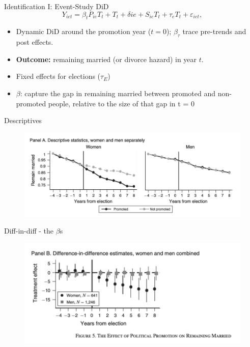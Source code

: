 \documentclass[11pt,notes=hide,aspectratio=169,mathserif]{beamer}
\begin{document}
\begin{frame}{Identification I: Event-Study DiD}
\small
\[
Y_{iet} = \beta_t P_{ie} T_t + T_t + \delta{ie} + S_{ie} T_t + \tau_e T_t + \varepsilon_{iet},
\]
\begin{itemize}
  \item Dynamic DiD around the promotion year (\(t=0\)); \(\beta_\tau\) trace pre-trends and post effects.
  \item \textbf{Outcome:} remaining married (or divorce hazard) in year \(t\).
  \item Fixed effects for elections ($\tau_E$) 
  \item $\beta$: capture the gap in remaining married between promoted and non-promoted people, relative to the size of that gap in t = 0
\end{itemize}
\end{frame}

\begin{frame}{Descriptives}
\small
\begin{figure}
\centering
\includegraphics[width=0.8\linewidth]{inputs/fig1.png}
\end{figure}
\end{frame}


\begin{frame}{Diff-in-diff - the $\beta$s}
\small
\begin{figure}
\centering
\includegraphics[width=0.8\linewidth]{inputs/fig2.png}
\end{figure}
\end{frame}
\end{document}
